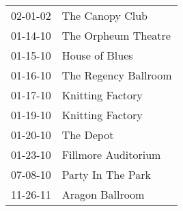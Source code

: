 \begin{supertabular}{p{0.25\columnwidth}p{0.75\columnwidth}}
 02-01-02 &       The Canopy Club \\
 01-14-10 &   The Orpheum Theatre \\
 01-15-10 &        House of Blues \\
 01-16-10 &  The Regency Ballroom \\
 01-17-10 &      Knitting Factory \\
 01-19-10 &      Knitting Factory \\
 01-20-10 &             The Depot \\
 01-23-10 &   Fillmore Auditorium \\
 07-08-10 &     Party In The Park \\
 11-26-11 &       Aragon Ballroom \\
\end{supertabular}
